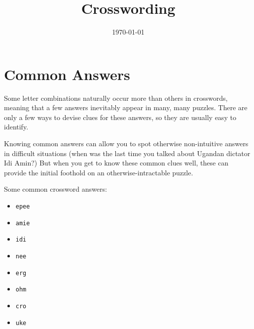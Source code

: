 \documentclass{article}
\title{Crosswording}
\date{\today}
\begin{document}
\maketitle

\section{Common Answers}\label{common-answers}

Some letter combinations naturally occur more than others in crosswords,
meaning that a few answers inevitably appear in many, many puzzles.
There are only a few ways to devise clues for these answers, so they are
usually easy to identify.

Knowing common answers can allow you to spot otherwise non-intuitive
answers in difficult situations (when was the last time you talked about
Ugandan dictator Idi Amin?) But when you get to know these common clues
well, these can provide the initial foothold on an otherwise-intractable
puzzle.

Some common crossword answers:

\begin{itemize}

\item
  \texttt{epee}
\item
  \texttt{amie}
\item
  \texttt{idi}
\item
  \texttt{nee}
\item
  \texttt{erg}
\item
  \texttt{ohm}
\item
  \texttt{cro}
\item
  \texttt{uke}
\end{itemize}
\end{document}
